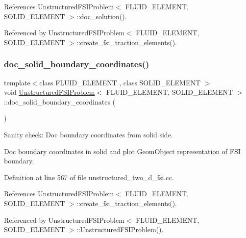 References Unstructured\+F\+S\+I\+Problem$<$ F\+L\+U\+I\+D\+\_\+\+E\+L\+E\+M\+E\+N\+T, S\+O\+L\+I\+D\+\_\+\+E\+L\+E\+M\+E\+N\+T $>$\+::doc\+\_\+solution().



Referenced by Unstructured\+F\+S\+I\+Problem$<$ F\+L\+U\+I\+D\+\_\+\+E\+L\+E\+M\+E\+N\+T, S\+O\+L\+I\+D\+\_\+\+E\+L\+E\+M\+E\+N\+T $>$\+::create\+\_\+fsi\+\_\+traction\+\_\+elements().

\mbox{\label{classUnstructuredFSIProblem_a6b86e58ba6cf2871a8e049dd91f6b8b9}} 
\subsubsection{\texorpdfstring{doc\+\_\+solid\+\_\+boundary\+\_\+coordinates()}{doc\_solid\_boundary\_coordinates()}}
{\footnotesize\ttfamily template$<$class F\+L\+U\+I\+D\+\_\+\+E\+L\+E\+M\+E\+NT , class S\+O\+L\+I\+D\+\_\+\+E\+L\+E\+M\+E\+NT $>$ \\
void \hyperlink{classUnstructuredFSIProblem}{Unstructured\+F\+S\+I\+Problem}$<$ F\+L\+U\+I\+D\+\_\+\+E\+L\+E\+M\+E\+NT, S\+O\+L\+I\+D\+\_\+\+E\+L\+E\+M\+E\+NT $>$\+::doc\+\_\+solid\+\_\+boundary\+\_\+coordinates (\begin{DoxyParamCaption}{ }\end{DoxyParamCaption})\hspace{0.3cm}{\ttfamily [private]}}



Sanity check\+: Doc boundary coordinates from solid side. 

Doc boundary coordinates in solid and plot Geom\+Object representation of F\+SI boundary. 

Definition at line 567 of file unstructured\+\_\+two\+\_\+d\+\_\+fsi.\+cc.



References Unstructured\+F\+S\+I\+Problem$<$ F\+L\+U\+I\+D\+\_\+\+E\+L\+E\+M\+E\+N\+T, S\+O\+L\+I\+D\+\_\+\+E\+L\+E\+M\+E\+N\+T $>$\+::create\+\_\+fsi\+\_\+traction\+\_\+elements().



Referenced by Unstructured\+F\+S\+I\+Problem$<$ F\+L\+U\+I\+D\+\_\+\+E\+L\+E\+M\+E\+N\+T, S\+O\+L\+I\+D\+\_\+\+E\+L\+E\+M\+E\+N\+T $>$\+::\+Unstructured\+F\+S\+I\+Problem().

